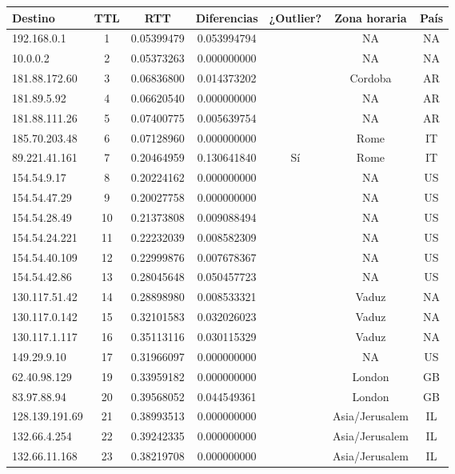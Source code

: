 \begin{center}
\begin{tabular}{lcccccc}
Destino & TTL & RTT & Diferencias & ¿Outlier? & Zona horaria & País\\
\hline
192.168.0.1 & 1 & 0.05399479 & 0.053994794 &  & NA & NA\\
10.0.0.2 & 2 & 0.05373263 & 0.000000000 &  & NA & NA\\
181.88.172.60 & 3 & 0.06836800 & 0.014373202 &  & Cordoba & AR\\
181.89.5.92 & 4 & 0.06620540 & 0.000000000 &  & NA & AR\\
181.88.111.26 & 5 & 0.07400775 & 0.005639754 &  & NA & AR\\
185.70.203.48 & 6 & 0.07128960 & 0.000000000 &  & Rome & IT\\
89.221.41.161 & 7 & 0.20464959 & 0.130641840 & Sí & Rome & IT\\
154.54.9.17 & 8 & 0.20224162 & 0.000000000 &  & NA & US\\
154.54.47.29 & 9 & 0.20027758 & 0.000000000 &  & NA & US\\
154.54.28.49 & 10 & 0.21373808 & 0.009088494 &  & NA & US\\
154.54.24.221 & 11 & 0.22232039 & 0.008582309 &  & NA & US\\
154.54.40.109 & 12 & 0.22999876 & 0.007678367 &  & NA & US\\
154.54.42.86 & 13 & 0.28045648 & 0.050457723 &  & NA & US\\
130.117.51.42 & 14 & 0.28898980 & 0.008533321 &  & Vaduz & NA\\
130.117.0.142 & 15 & 0.32101583 & 0.032026023 &  & Vaduz & NA\\
130.117.1.117 & 16 & 0.35113116 & 0.030115329 &  & Vaduz & NA\\
149.29.9.10 & 17 & 0.31966097 & 0.000000000 &  & NA & US\\
62.40.98.129 & 19 & 0.33959182 & 0.000000000 &  & London & GB\\
83.97.88.94 & 20 & 0.39568052 & 0.044549361 &  & London & GB\\
128.139.191.69 & 21 & 0.38993513 & 0.000000000 &  & Asia/Jerusalem & IL\\
132.66.4.254 & 22 & 0.39242335 & 0.000000000 &  & Asia/Jerusalem & IL\\
132.66.11.168 & 23 & 0.38219708 & 0.000000000 &  & Asia/Jerusalem & IL\\
\end{tabular}
\end{center}
